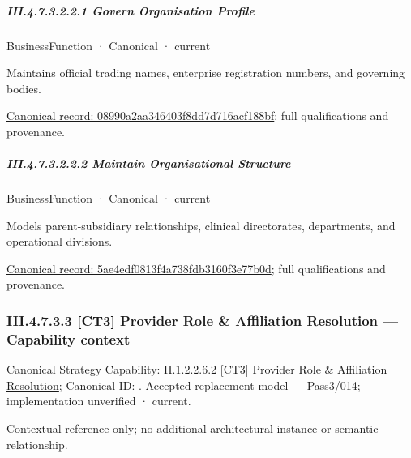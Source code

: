 \subparagraph*{III.4.7.3.2.2.1 Govern Organisation Profile}
\label{navigation:III.4.7.3.2.2.1}

\label{element:08990a2aa346403f8dd7d716acf188bf}
{\small BusinessFunction · Canonical · current}\par

Maintains official trading names, enterprise registration numbers, and governing bodies.


{\footnotesize \href{../../../../continuum/business/business-function/08990a2aa346403f8dd7d716acf188bf.md}{Canonical record: 08990a2aa346403f8dd7d716acf188bf}; full qualifications and provenance.}\par
\subparagraph*{III.4.7.3.2.2.2 Maintain Organisational Structure}
\label{navigation:III.4.7.3.2.2.2}

\label{element:5ae4edf0813f4a738fdb3160f3e77b0d}
{\small BusinessFunction · Canonical · current}\par

Models parent-subsidiary relationships, clinical directorates, departments, and operational divisions.


{\footnotesize \href{../../../../continuum/business/business-function/5ae4edf0813f4a738fdb3160f3e77b0d.md}{Canonical record: 5ae4edf0813f4a738fdb3160f3e77b0d}; full qualifications and provenance.}\par
\subsubsection*{III.4.7.3.3 [CT3] Provider Role \& Affiliation Resolution — Capability context}
\label{navigation:III.4.7.3.3}

{\small Canonical Strategy Capability: II.1.2.2.6.2 \hyperref[element:dd0d16f6e6b9491c85deea915bb7bf4d]{[CT3] Provider Role \& Affiliation Resolution}; Canonical ID: \texttt{}. Accepted replacement model — Pass3/014; implementation unverified · current.}\par
Contextual reference only; no additional architectural instance or semantic relationship.\par
